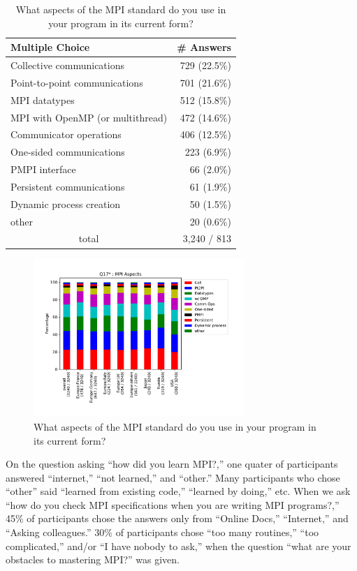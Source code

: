 \documentclass[sigconf,nonacm]{acmart}
\begin{document}
{\small
\begin{table}[htb]%
\begin{center}%
\caption{What aspects of the MPI standard do you use in your program in its current form?}%
\label{tab:Q17-ans}%
\begin{tabular}{l|r}%
\hline%
Multiple Choice & \# Answers \\%
\hline%
Collective communications & 729 (22.5\%) \\%
Point-to-point communications & 701 (21.6\%) \\%
MPI datatypes & 512 (15.8\%) \\%
MPI with OpenMP (or multithread) & 472 (14.6\%) \\%
Communicator operations & 406 (12.5\%) \\%
One-sided communications & 223 (6.9\%) \\%
PMPI interface & 66 (2.0\%) \\%
Persistent communications & 61 (1.9\%) \\%
Dynamic process creation & 50 (1.5\%) \\%
other & 20 (0.6\%) \\%
\hline%
\multicolumn{1}{c}{total} & 3,240 / 813 \\%
\hline%
\end{tabular}%
\end{center}%
\end{table}%
}

\begin{figure}[htb]
\begin{center}
\includegraphics[width=8cm]{figs/Q17.pdf}
\vspace{-8mm}
\caption{What aspects of the MPI standard do you use in your program in its current form?}%
\label{fig:Q17}
\end{center}
\end{figure}

On the question asking ``how did you learn MPI?,'' one quater of
participants answered ``internet,'' ``not learned,'' and ``other.'' Many
participants who chose ``other'' said ``learned from existing
code,''  ``learned by doing,'' etc. 
When we ask ``how do you check
MPI specifications when you are writing MPI programs?,'' 45\% of
participants chose the answers only from ``Online Docs,''
``Internet,'' and ``Asking colleagues.''
30\% of participants chose ``too many routines,'' ``too complicated,''
and/or ``I have nobody to ask,'' when the question ``what are your
obstacles to mastering MPI?'' was given. 
\end{document}
